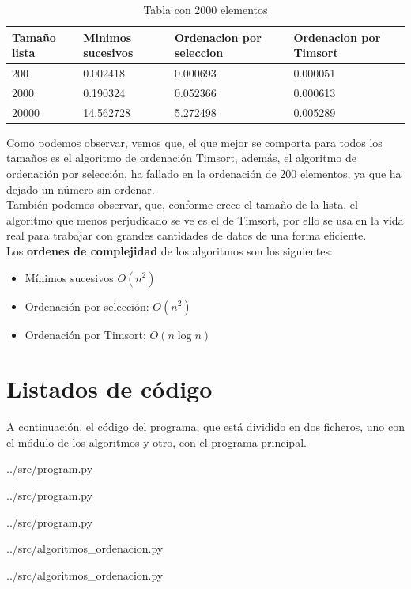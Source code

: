 \documentclass[a4,12pt]{article}
\newcommand{\gris}{\color[gray]{0.9}}
\newcommand{\grisos}{\color[gray]{0.5}}
\newcommand{\showprog}[3]
{
	
	\begin{minipage}{\textwidth}
		
		{../src/#1}
	\end{minipage} 
}
\begin{document}
	\begin{table}[h]
		\begin{center}
			
			\begin{tabular}{l|l|l|l|}
				Tamaño lista & Minimos sucesivos & Ordenacion por seleccion & Ordenacion por Timsort \\\hline
				200 & 0.002418 & 0.000693 & 0.000051 \\
				2000 & 0.190324 & 0.052366 & 0.000613 \\
				20000 & 14.562728 & 5.272498 & 0.005289
			\end{tabular}
			
		\end{center}
		
		\caption{Tabla con 2000 elementos}
		\label{tab:tab1}
	\end{table}
	Como podemos observar, vemos que, el que mejor se comporta para todos los tamaños es el algoritmo de ordenación Timsort, además, el algoritmo de ordenación por selección, ha fallado en la ordenación de 200 elementos, ya que ha dejado un número sin ordenar.\\
	
	También podemos observar, que, conforme crece el tamaño de la lista, el algoritmo que menos perjudicado se ve es el de Timsort, por ello se usa en la vida real para trabajar con grandes cantidades de datos de una forma eficiente.\\
	
	Los \textbf{ordenes de complejidad} de los algoritmos son los siguientes:
	\begin{itemize}
		\item Mínimos sucesivos
			\subitem $O(n^{2})$
		\item Ordenación por selección:
			\subitem $O(n^{2})$
		\item Ordenación por Timsort:
			\subitem $O(n\log{n})$
	\end{itemize}
	
	\section{Listados de código}
	A continuación, el código del programa, que está dividido en dos ficheros, uno con el módulo de los algoritmos y otro, con el programa principal.
	
	\showprog{program.py}{40}{0}
	\showprog{program.py}{75}{41}
	\showprog{program.py}{110}{76}
	
	\showprog{algoritmos\string_ordenacion.py}{35}{0}
	\showprog{algoritmos\string_ordenacion.py}{48}{36}
	
\end{document}
